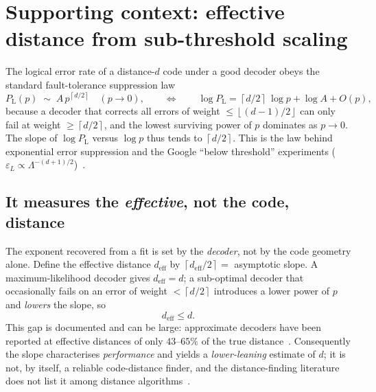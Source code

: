 \documentclass[11pt]{article}
\newcommand{\PL}{P_{\mathrm{L}}}
\newcommand{\deff}{d_{\mathrm{eff}}}
\newcommand{\ceil}[1]{\left\lceil #1 \right\rceil}
\newcommand{\floor}[1]{\left\lfloor #1 \right\rfloor}
\begin{document}
\section{Supporting context: effective distance from sub-threshold scaling}
\label{sec:slope}

The logical error rate of a distance-$d$ code under a good decoder obeys the
standard fault-tolerance suppression law
\begin{equation}
  \PL(p)\;\sim\;A\,p^{\ceil{d/2}}\quad(p\to0),
  \qquad\Longleftrightarrow\qquad
  \log\PL = \ceil{d/2}\,\log p + \log A + O(p),
  \label{eq:scaling}
\end{equation}
because a decoder that corrects all errors of weight $\le\floor{(d-1)/2}$ can only
fail at weight $\ge\ceil{d/2}$, and the lowest surviving power of $p$ dominates as
$p\to0$. The slope of $\log\PL$ versus $\log p$ thus tends to $\ceil{d/2}$. This
is the law behind exponential error suppression and the Google ``below threshold''
experiments ($\varepsilon_L\propto\Lambda^{-(d+1)/2}$)~\cite{DKLP,Google}.

\subsection{It measures the \emph{effective}, not the code, distance}
The exponent recovered from a fit is set by the \emph{decoder}, not by the code
geometry alone. Define the effective distance $\deff$ by
$\ceil{\deff/2}=$ asymptotic slope. A maximum-likelihood decoder gives $\deff=d$;
a sub-optimal decoder that occasionally fails on an error of weight $<\ceil{d/2}$
introduces a lower power of $p$ and \emph{lowers} the slope, so
\begin{equation}
  \deff\le d .
  \label{eq:effle}
\end{equation}
This gap is documented and can be large: approximate decoders have been reported
at effective distances of only $43$--$65\%$ of the true distance~\cite{Google}.
Consequently the slope characterises \emph{performance} and yields a
\emph{lower-leaning} estimate of $d$; it is not, by itself, a reliable
code-distance finder, and the distance-finding literature does not list it among
distance algorithms~\cite{Survey}.
\end{document}
